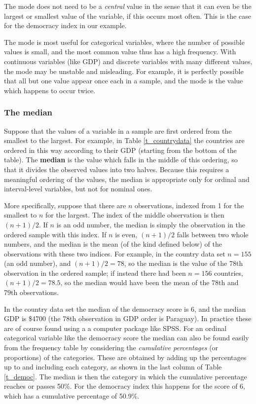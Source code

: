 The mode does not need to be a \emph{central} value in the sense that it can
even be the largest or smallest value of the variable, if this occurs
most often. This is the case for the democracy index in our example.

The mode is most useful for categorical variables, where the number of
possible values is small, and the most common value thus has a high
frequency. With continuous variables (like GDP) and discrete variables
with many different values, the mode may be unstable and misleading. For
example, it is perfectly possible that all but one value appear once
each in a sample, and the mode is the value which happens to occur
twice.

\subsubsection{The median}

Suppose that the values of a variable in a sample are first ordered from
the smallest to the largest. For example, in Table \ref{t_countrydata}
the countries are ordered in this way according to their GDP (starting
from the bottom of the table). The \textbf{median} is the value which
falls in the middle of this ordering, so that it divides the observed
values into two halves. Because this requires a meaningful ordering of
the values, the median is appropriate only for ordinal and
interval-level variables, but not for nominal ones.

More specifically, suppose that there are $n$ observations, indexed from
1 for the smallest to $n$ for the largest. The index of the middle
observation is then $(n+1)/2$. If $n$ is an odd number, the median is
simply the observation in the ordered sample with this index. If $n$ is
even, $(n+1)/2$ falls between two whole numbers, and the median is the
mean (of the kind defined below) of the observations with these two
indices. For example, in the country data set $n=155$ (an odd number),
and $(n+1)/2=78$, so the median is the value of the 78th observation in
the ordered sample; if instead there had been $n=156$ countries,
$(n+1)/2=78.5$, so the median would have been the mean
of the 78th and 79th observations.

In the country data set the median of the democracy score is 6, and the
median GDP is \$4700 (the 78th observation in GDP order is Paraguay). In
practice these are of course found using a a computer package like SPSS.
For an ordinal categorical variable like the democracy score the median
can also be found easily from the frequency table by considering the
\emph{cumulative percentages} (or proportions) of the categories. These
are obtained by adding up the percentages up to and including each
category, as shown in the last column of Table \ref{t_democ}. The median
is then the category in which the cumulative percentage reaches or
passes 50\%. For the democracy index this happens for
the score of 6, which has a cumulative percentage of 50.9\%.

